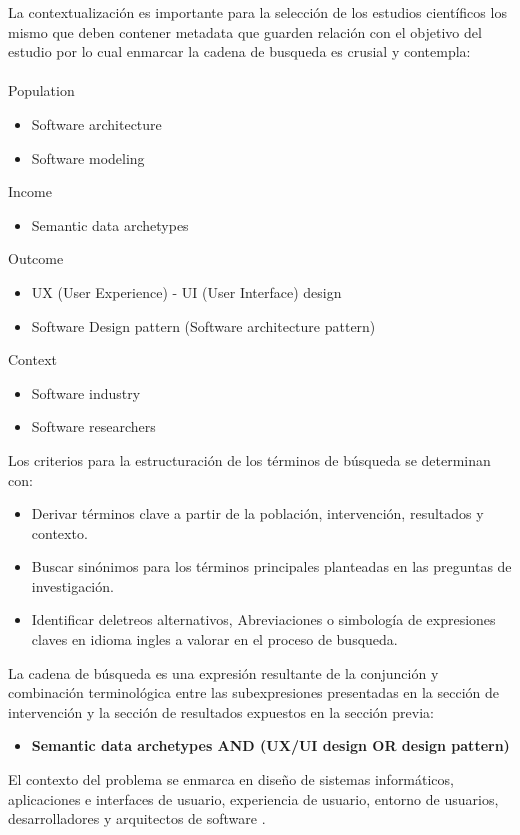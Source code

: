 \documentclass[12pt,a4paper]{article}
\begin{document}
La contextualización es importante para la selección de los estudios científicos los mismo que deben contener metadata que guarden relación con el objetivo del estudio por lo cual enmarcar la cadena de busqueda es crusial y contempla:
\\\\
Population 
\begin{itemize}
  \item Software architecture 
  \item Software modeling 
\end{itemize}
Income
\begin{itemize}
  \item Semantic data archetypes
\end{itemize}
Outcome 
\begin{itemize}
  \item UX (User Experience) - UI (User Interface) design 
  \item Software Design pattern (Software architecture pattern)
\end{itemize}
Context 
\begin{itemize}
  \item Software industry
  \item Software researchers 
\end{itemize}

Los criterios para la estructuración de los términos de búsqueda se determinan con:
\begin{itemize}
  \item
   Derivar términos clave a partir de la población, intervención, resultados y contexto.
  \item
   Buscar sinónimos para los términos principales planteadas en las preguntas de investigación.
  \item
   Identificar deletreos alternativos, Abreviaciones o simbología de expresiones claves en idioma ingles a valorar en el proceso de busqueda.
\end{itemize}

La cadena de búsqueda es una expresión resultante de la conjunción y combinación terminológica entre las subexpresiones presentadas en la sección de intervención y la sección de resultados expuestos en la sección previa:
\begin{itemize}
  \item  \textbf{  Semantic data archetypes AND (UX/UI design OR design pattern) }
\end{itemize}

El contexto del problema se enmarca en diseño de sistemas informáticos, aplicaciones e interfaces de usuario, experiencia de usuario, entorno de usuarios, desarrolladores y arquitectos de software
\cite{CardosodeMoraes2016}
\cite{Kopanitsa2015}
\cite{Hassan2016813}
.
\end{document}
